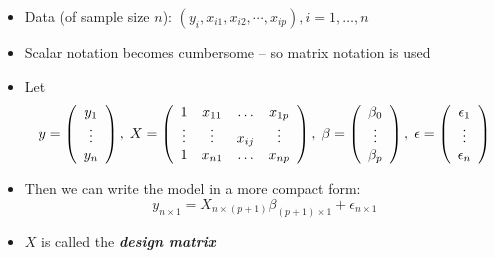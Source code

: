 \documentclass[10pt]{beamer} %
\begin{document}
\begin{frame}
   \frametitle{ }
   \begin{itemize}
      \item Data (of sample size $n$): $(y_i, x_{i1}, x_{i2}, \cdots, x_{ip}), i = 1,\ldots,n$
         \vspace{0.25cm}	
      \item Scalar notation becomes cumbersome -- so matrix notation is used
         \vspace{0.25cm}		
      \item Let
         \begin{displaymath}
            y = \left(
               \begin{array}{c}
                  y_1 \\
                  \vdots \\
                  y_n \\
               \end{array}
            \right), \hspace{0.1cm}  %
            X = \left(
               \begin{array}{cccc}
                  1 & x_{11} & \hdots & x_{1p} \\
                  \vdots & \vdots & x_{ij} & \vdots \\
                  1 & x_{n1} & \hdots & x_{np} \\
               \end{array}
            \right), \hspace{0.1cm} %
            \beta = \left(
               \begin{array}{c}
                  \beta_0 \\
                  \vdots \\
                  \beta_p \\
               \end{array}
            \right), \hspace{0.1cm} %
            \epsilon = \left(
               \begin{array}{c}
                  \epsilon_1 \\
                  \vdots \\
                  \epsilon_n \\
               \end{array}
            \right)
         \end{displaymath}
         \bigskip
      \item Then we can write the model in a more compact form:
         $$ y_{n \times 1} = X_{n \times (p+1)} \beta_{(p+1) \times 1} + \epsilon_{n \times 1}$$
      \item $X$ is called the \textbf{\emph{design matrix}}
   \end{itemize}	


\end{frame}
\end{document}
